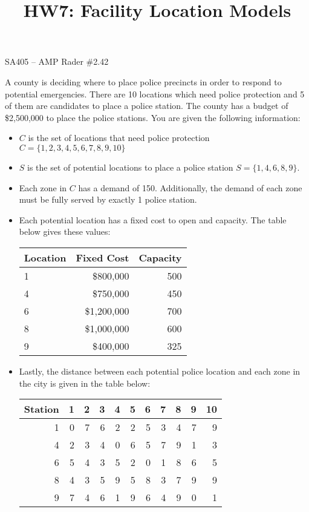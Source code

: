 \documentclass[11pt]{article}
\makeatletter
\theoremstyle{definition}
\renewcommand{\maketitle}{
  \noindent SA405 -- AMP \hfill Rader \#2.42 \\

  \begin{center}\Large{\textbf{\@title}}\end{center}
}
\makeatother
\begin{document}
  
\title{HW7: Facility Location Models}


\maketitle

% 
A county is deciding where to place police precincts in order to respond to potential emergencies. There are 10 locations which need police protection and 5 of them are candidates to place a police station. The county has a budget of \$2,500,000 to place the police stations. You are given the following information:
\begin{itemize}
\item $C$ is the set of locations that need police protection $C = \{1,2,3,4,5,6,7,8,9,10\}$
\item $S$ is the set of potential locations to place a police station $S = \{1,4,6,8,9\}$. 
\item Each zone in $C$ has a demand of 150. Additionally, the demand of each zone must be fully served by exactly 1 police station.
\item Each potential location has a fixed cost to open and capacity. The table below gives these values:

\begin{center}
\begin{tabular}{|l|r|r|} \hline
Location & Fixed Cost & Capacity \\ \hline
1 & \$800,000 & 500 \\
4 & \$750,000 & 450 \\
6 & \$1,200,000 & 700 \\
8 & \$1,000,000 & 600 \\
9 & \$400,000 & 325  \\ \hline
\end{tabular}
\end{center}

\item Lastly, the distance between each potential police location and each zone in the city is given in the table below:

\begin{center}
\begin{tabular}{|r|r|r|r|r|r|r|r|r|r|r|} \hline
Station & 1 & 2 & 3 & 4 & 5 & 6 & 7 & 8 & 9 & 10 \\ \hline
1       & 0 & 7 & 6 & 2 & 2 & 5 & 3 & 4 & 7 & 9 \\
4       & 2 & 3 & 4 & 0 & 6 & 5 & 7 & 9 & 1 & 3 \\
6       & 5 & 4 & 3 & 5 & 2 & 0 & 1 & 8 & 6 & 5 \\
8       & 4 & 3 & 5 & 9 & 5 & 8 & 3 & 7 & 9 & 9 \\
9       & 7 & 4 & 6 & 1 & 9 & 6 & 4 & 9 & 0 & 1 \\ \hline
\end{tabular}
\end{center}
\end{itemize}
\end{document}
